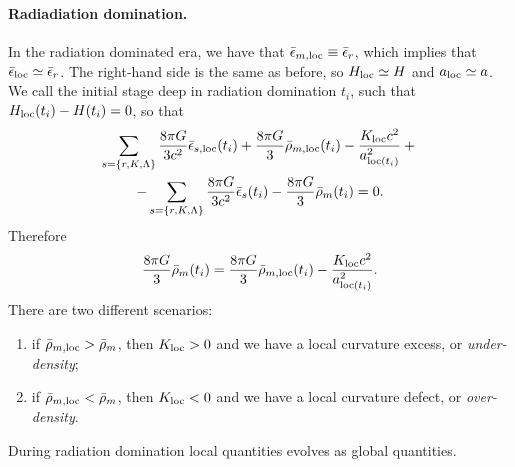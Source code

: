 \paragraph{Radiadiation domination.} In the radiation dominated era, we have that $\bar{\epsilon}_{m,\mathrm{loc}} \equiv \bar{\epsilon}_r$, which implies that $\bar{\epsilon}_{\mathrm{loc}} \simeq \bar{\epsilon}_r$. The right-hand side is the same as before, so $H_{\mathrm{loc}} \simeq H$ and $a_{\mathrm{loc}} \simeq a$. We call the initial stage deep in radiation domination $t_i$, such that $H_{\mathrm{loc}}(t_i) - H(t_i) = 0$, so that 
\begin{multline}
    \sum_{s=\{r,K,\Lambda\}}\frac{8\pi G}{3c^2}\bar{\epsilon}_{s,\mathrm{loc}}(t_i) + \frac{8\pi G}{3}\bar{\rho}_{m,\mathrm{loc}}(t_i) - \frac{K_{\mathrm{loc}}c^2}{a^2_{\mathrm{loc}(t_i)}} + {}\\
    - \sum_{s=\{r,K,\Lambda\}}\frac{8\pi G}{3c^2}\bar{\epsilon}_{s}(t_i) - \frac{8\pi G}{3}\bar{\rho}_{m}(t_i) = 0.
\end{multline}
Therefore 
\begin{equation}
    \frac{8\pi G}{3}\bar{\rho}_{m}(t_i) = \frac{8\pi G}{3}\bar{\rho}_{m,\mathrm{loc}}(t_i) - \frac{K_{\mathrm{loc}}c^2}{a^2_{\mathrm{loc}(t_i)}}.
\end{equation}
There are two different scenarios:
\begin{enumerate}
    \item if $\bar{\rho}_{m,\mathrm{loc}} > \bar{\rho}_m$, then $K_{\mathrm{loc}} > 0$ and we have a local curvature excess, or \emph{under-density};
    \item if $\bar{\rho}_{m,\mathrm{loc}} < \bar{\rho}_m$, then $K_{\mathrm{loc}} < 0$ and we have a local curvature defect, or \emph{over-density}.
\end{enumerate}
During radiation domination local quantities evolves as global quantities.

